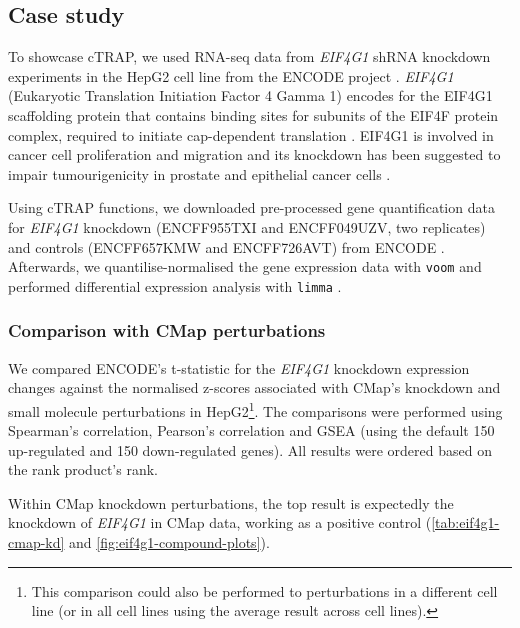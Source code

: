 \subsection{Case study}

To showcase cTRAP, we used RNA-seq data from \emph{EIF4G1} shRNA knockdown experiments in the HepG2 cell line from the ENCODE project \cite{luo:2019tp}. \emph{EIF4G1} (Eukaryotic Translation Initiation Factor 4 Gamma 1) encodes for the EIF4G1 scaffolding protein that contains binding sites for subunits of the EIF4F protein complex, required to initiate cap-dependent translation \cite{luo:2019tp,tu:2010vi,jaiswal:2018uq}. EIF4G1 is involved in cancer cell proliferation and migration and its knockdown has been suggested to impair tumourigenicity in prostate and epithelial cancer cells \cite{tu:2010vi,jaiswal:2018uq}.

Using cTRAP functions, we downloaded pre-processed gene quantification data for \emph{EIF4G1} knockdown (ENCFF955TXI and ENCFF049UZV, two replicates) and controls (ENCFF657KMW and ENCFF726AVT) from ENCODE \cite{luo:2019tp}. Afterwards, we quantilise-normalised the gene expression data with \texttt{voom} \cite{ritchie:2015tm} and performed differential expression analysis with \texttt{limma} \cite{ritchie:2015tm}.

\subsubsection{Comparison with CMap perturbations}

We compared ENCODE's t-statistic for the \emph{EIF4G1} knockdown expression changes against the normalised z-scores associated with CMap's knockdown and small molecule perturbations in HepG2\footnote{This comparison could also be performed to perturbations in a different cell line (or in all cell lines using the average result across cell lines).}. The comparisons were performed using Spearman's correlation, Pearson's correlation and GSEA (using the default 150 up-regulated and 150 down-regulated genes). All results were ordered based on the rank product's rank.

Within CMap knockdown perturbations, the top result is expectedly the knockdown of \emph{EIF4G1} in CMap data, working as a positive control (\autoref{tab:eif4g1-cmap-kd} and \autoref{fig:eif4g1-compound-plots}).

